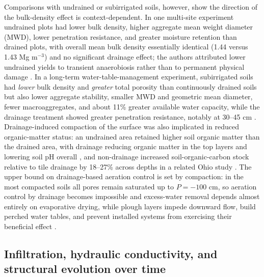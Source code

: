Comparisons with undrained or subirrigated soils, however, show the direction of the
bulk-density effect is context-dependent. In one multi-site experiment undrained
plots had lower bulk density, higher aggregate mean weight diameter (MWD), lower
penetration resistance, and greater moisture retention than drained plots, with
overall mean bulk density essentially identical (1.44 versus 1.43 Mg m$^{-3}$) and no
significant drainage effect; the authors attributed lower undrained yields to
transient anaerobiosis rather than to permanent physical damage
\parencite{LAL1993}. In a long-term water-table-management experiment, subirrigated
soils had \textit{lower} bulk density and \textit{greater} total porosity than
continuously drained soils but also lower aggregate stability, smaller MWD and
geometric mean diameter, fewer macroaggregates, and about 11\% greater available
water capacity, while the drainage treatment showed greater penetration resistance,
notably at 30--45 cm \parencite{Baker2004}. Drainage-induced compaction of the surface
was also implicated in reduced organic-matter status: an undrained area retained
higher soil organic matter than the drained area, with drainage reducing organic
matter in the top layers and lowering soil pH overall \parencite{FAUSEY1992}, and
non-drainage increased soil-organic-carbon stock relative to tile drainage by
18--27\% across depths in a related Ohio study \parencite{Kumar2014}. The upper bound
on drainage-based aeration control is set by compaction: in the most compacted soils
all pores remain saturated up to $P = -100$ cm, so aeration control by drainage
becomes impossible and excess-water removal depends almost entirely on evaporative
drying, while plough layers impede downward flow, build perched water tables, and
prevent installed systems from exercising their beneficial effect
\parencite{SMEDEMA1993}.

\subsection{Infiltration, hydraulic conductivity, and structural evolution over time}

